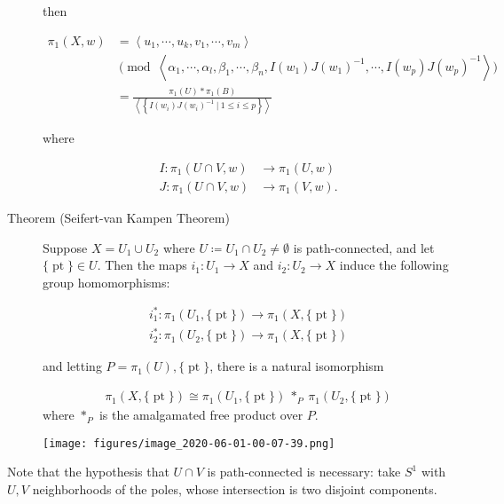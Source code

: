 \begin{description}
then

\begin{align*} \pi_{1}(X, w)  &= \left\langle u_{1}, \cdots, u_{k}, v_{1}, \cdots, v_{m}\right\rangle \\  &\pmod \left\langle \alpha_{1}, \cdots, \alpha_{l}, \beta_{1}, \cdots, \beta_{n}, I\left(w_{1}\right) J\left(w_{1}\right)^{-1}, \cdots, I\left(w_{p}\right) J\left(w_{p}\right)^{-1}\right\rangle \\ &= \frac{\pi_1(U) \ast \pi_1(B)} {\left\langle{\left\{{I(w_i) J(w_i)^{-1}{~\mathrel{\Big|}~}1\leq i \leq p}\right\}}\right\rangle} \end{align*}

where

\begin{align*} I: \pi_{1}(U \cap V, w) &\rightarrow \pi_{1}(U, w) \\ J: \pi_{1}(U \cap V, w) &\rightarrow \pi_{1}(V, w) .\end{align*}
\item[Theorem (Seifert-van Kampen Theorem)]
Suppose \(X = U_1 \cup U_2\) where
\(U \coloneqq U_1 \cap U_2 \neq \emptyset\) is path-connected, and let
\({\{\operatorname{pt}\}}\in U\). Then the maps \(i_1: U_1 \to X\) and
\(i_2: U_2 \to X\) induce the following group homomorphisms:

\begin{align*}
i_1^*: \pi_1(U_1 ,{\{\operatorname{pt}\}}) \to\pi_1(X, {\{\operatorname{pt}\}}) \\
i_2^*: \pi_1(U_2 ,{\{\operatorname{pt}\}}) \to\pi_1(X, {\{\operatorname{pt}\}})
\end{align*}

and letting \(P = \pi_1(U), {\{\operatorname{pt}\}}\), there is a
natural isomorphism

\begin{align*}
\pi_1(X, {\{\operatorname{pt}\}}) \cong \pi_1(U_1, {\{\operatorname{pt}\}}) ~\ast_P~ \pi_1(U_2, {\{\operatorname{pt}\}})
\end{align*}
where \(\ast_P\) is the amalgamated free product over \(P\).


\texttt{[image: figures/image\_2020-06-01-00-07-39.png]}
\end{description}

Note that the hypothesis that \(U\cap V\) is path-connected is
necessary: take \(S^1\) with \(U,V\) neighborhoods of the poles, whose
intersection is two disjoint components.

